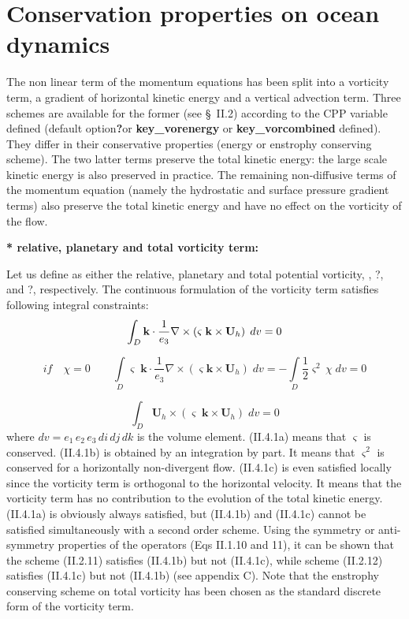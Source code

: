 \documentclass[../main/NEMO_manual]{subfiles}
\begin{document}
\section{Conservation properties on ocean dynamics}
\label{sec:Invariant_dyn}

The non linear term of the momentum equations has been split into a vorticity term,
a gradient of horizontal kinetic energy and a vertical advection term.
Three schemes are available for the former (see {\S}~II.2) according to the CPP variable defined
(default option\textbf{?}or \textbf{key{\_}vorenergy} or \textbf{key{\_}vorcombined} defined).
They differ in their conservative properties (energy or enstrophy conserving scheme).
The two latter terms preserve the total kinetic energy:
the large scale kinetic energy is also preserved in practice.
The remaining non-diffusive terms of the momentum equation
(namely the hydrostatic and surface pressure gradient terms) also preserve the total kinetic energy and
have no effect on the vorticity of the flow.

\textbf{* relative, planetary and total vorticity term:}

Let us define as either the relative, planetary and total potential vorticity, \ie, ?, and ?, respectively.
The continuous formulation of the vorticity term satisfies following integral constraints:
\[
  \int_D {{\textbf {k}}\cdot \frac{1}{e_3 }\nabla \times \left( {\varsigma
        \;{\rm {\bf k}}\times {\textbf {U}}_h } \right)\;dv} =0
\]

\[
  if\quad \chi =0\quad \quad \int\limits_D {\varsigma \;{\textbf{k}}\cdot
    \frac{1}{e_3 }\nabla \times \left( {\varsigma {\textbf{k}}\times {\textbf{U}}_h } \right)\;dv} =-\int\limits_D {\frac{1}{2}\varsigma ^2\,\chi \;dv}
  =0
\]

\[
  \int_D {{\textbf{U}}_h \times \left( {\varsigma \;{\textbf{k}}\times {\textbf{U}}_h } \right)\;dv} =0
\]
where $dv = e_1\, e_2\, e_3\, di\, dj\, dk$ is the volume element.
(II.4.1a) means that $\varsigma $ is conserved. (II.4.1b) is obtained by an integration by part.
It means that $\varsigma^2$ is conserved for a horizontally non-divergent flow.
(II.4.1c) is even satisfied locally since the vorticity term is orthogonal to the horizontal velocity.
It means that the vorticity term has no contribution to the evolution of the total kinetic energy.
(II.4.1a) is obviously always satisfied, but (II.4.1b) and (II.4.1c) cannot be satisfied simultaneously with
a second order scheme.
Using the symmetry or anti-symmetry properties of the operators (Eqs II.1.10 and 11),
it can be shown that the scheme (II.2.11) satisfies (II.4.1b) but not (II.4.1c),
while scheme (II.2.12) satisfies (II.4.1c) but not (II.4.1b) (see appendix C). 
Note that the enstrophy conserving scheme on total vorticity has been chosen as the standard discrete form of
the vorticity term.
\end{document}
